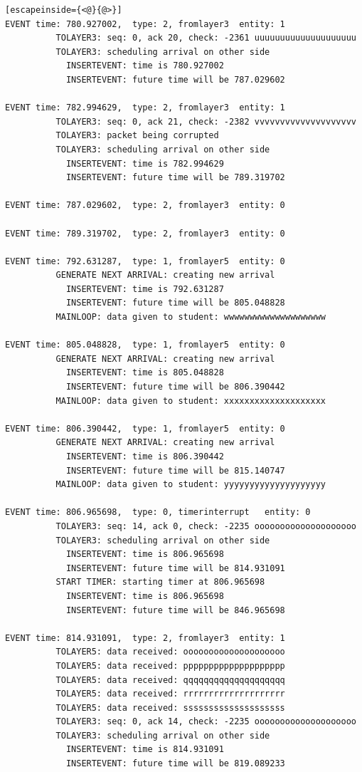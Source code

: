 \documentclass[paper=a4, fontsize=11pt]{scrartcl}
\numberwithin{equation}{section}		%
\numberwithin{figure}{section}			%
\numberwithin{table}{section}				%
\begin{document}
\begin{lstlisting}[escapeinside={<@}{@>}]
EVENT time: 780.927002,  type: 2, fromlayer3  entity: 1
          TOLAYER3: seq: 0, ack 20, check: -2361 uuuuuuuuuuuuuuuuuuuu
          TOLAYER3: scheduling arrival on other side
            INSERTEVENT: time is 780.927002
            INSERTEVENT: future time will be 787.029602

EVENT time: 782.994629,  type: 2, fromlayer3  entity: 1
          TOLAYER3: seq: 0, ack 21, check: -2382 vvvvvvvvvvvvvvvvvvvv
          TOLAYER3: packet being corrupted
          TOLAYER3: scheduling arrival on other side
            INSERTEVENT: time is 782.994629
            INSERTEVENT: future time will be 789.319702

EVENT time: 787.029602,  type: 2, fromlayer3  entity: 0

EVENT time: 789.319702,  type: 2, fromlayer3  entity: 0

EVENT time: 792.631287,  type: 1, fromlayer5  entity: 0
          GENERATE NEXT ARRIVAL: creating new arrival
            INSERTEVENT: time is 792.631287
            INSERTEVENT: future time will be 805.048828
          MAINLOOP: data given to student: wwwwwwwwwwwwwwwwwwww

EVENT time: 805.048828,  type: 1, fromlayer5  entity: 0
          GENERATE NEXT ARRIVAL: creating new arrival
            INSERTEVENT: time is 805.048828
            INSERTEVENT: future time will be 806.390442
          MAINLOOP: data given to student: xxxxxxxxxxxxxxxxxxxx

EVENT time: 806.390442,  type: 1, fromlayer5  entity: 0
          GENERATE NEXT ARRIVAL: creating new arrival
            INSERTEVENT: time is 806.390442
            INSERTEVENT: future time will be 815.140747
          MAINLOOP: data given to student: yyyyyyyyyyyyyyyyyyyy

EVENT time: 806.965698,  type: 0, timerinterrupt   entity: 0
          TOLAYER3: seq: 14, ack 0, check: -2235 oooooooooooooooooooo
          TOLAYER3: scheduling arrival on other side
            INSERTEVENT: time is 806.965698
            INSERTEVENT: future time will be 814.931091
          START TIMER: starting timer at 806.965698
            INSERTEVENT: time is 806.965698
            INSERTEVENT: future time will be 846.965698

EVENT time: 814.931091,  type: 2, fromlayer3  entity: 1
          TOLAYER5: data received: oooooooooooooooooooo
          TOLAYER5: data received: pppppppppppppppppppp
          TOLAYER5: data received: qqqqqqqqqqqqqqqqqqqq
          TOLAYER5: data received: rrrrrrrrrrrrrrrrrrrr
          TOLAYER5: data received: ssssssssssssssssssss
          TOLAYER3: seq: 0, ack 14, check: -2235 oooooooooooooooooooo
          TOLAYER3: scheduling arrival on other side
            INSERTEVENT: time is 814.931091
            INSERTEVENT: future time will be 819.089233


\end{lstlisting}
\end{document}
